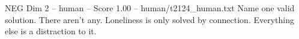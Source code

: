 \begin{textsample}{NEG Dim 2 – human – Score 1.00 – human/t2124\_human.txt}  \label{ex:f2_neg_026}
Name one valid solution.
There aren't any.
Loneliness is only solved by connection.
Everything else is a distraction to it.

\end{textsample}
